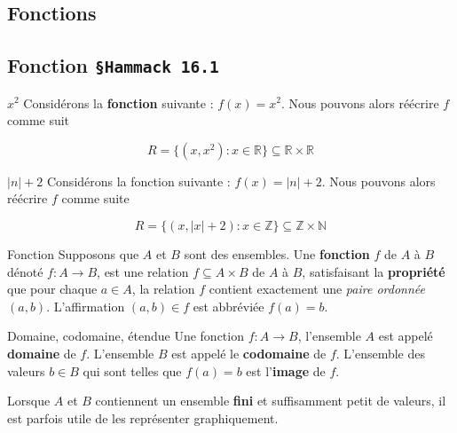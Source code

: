 \documentclass[16pt]{report}
\begin{document}
\begin{multicols*}{2}
    \pagebreak
    \chapter{Fonctions}

    \section{Fonction \texttt{\small{\S Hammack 16.1}}}

            \begin{EExample}{$x^2$}{}
                Considérons la \textbf{fonction} suivante : $f(x) = x^2$. Nous pouvons alors réécrire $f$ comme suit 

                \[ R = \{ (x, x^2) : x \in \mathbb{R} \} \subseteq \mathbb{R} \times \mathbb{R} \]
            \end{EExample}


            \begin{EExample}{$|n| + 2 $}{}
                Considérons la fonction suivante : $f(x)= |n| + 2$. Nous pouvons alors réécrire $f$ comme suite 

                \[ R = \{ (x, |x| +2) : x \in \mathbb{Z} \} \subseteq \mathbb{Z} \times \mathbb{N}\]
            \end{EExample}


            \begin{Definitionx}{Fonction}{}
                Supposons que $A$ et $B$ sont des ensembles. Une \textbf{fonction} $f$ de $A$ à $B$ 
                dénoté $f : A \rightarrow B$, est une relation $f \subseteq A \times B$ de $A$ à $B$, satisfaisant 
                la \textbf{propriété} que pour chaque $a \in A$, la relation $f$ contient exactement 
                une \textit{paire ordonnée} $(a,b)$. L'affirmation $(a,b) \in f$ est abbréviée $f(a) = b$.   
            \end{Definitionx}


            \begin{Definitionx}{Domaine, codomaine, étendue}{}
                Une fonction $f : A \rightarrow B$, l'ensemble $A$ est appelé \textbf{domaine}
                de $f$. L'ensemble $B$ est appelé le \textbf{codomaine} de $f$. L'ensemble des valeurs 
                $b \in B$ qui sont 
                telles que $f(a) = b$ est l'\textbf{image} de $f$.  
            \end{Definitionx}


            \begin{note}{}{}
                Lorsque $A$ et $B$ contiennent un ensemble \textbf{fini} et suffisamment petit de 
                valeurs, il est parfois utile de les représenter graphiquement. 
            \end{note}
            

\end{multicols*}
\end{document}
